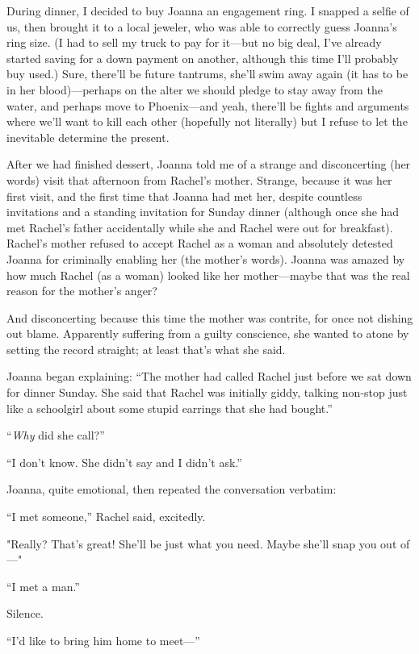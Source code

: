 During dinner, I decided to buy Joanna an engagement ring. I snapped a
selfie of us, then brought it to a local jeweler, who was able to
correctly guess Joanna's ring size. (I had to sell my truck to pay for
it---but no big deal, I've already started saving for a down payment on
another, although this time I'll probably buy used.) Sure, there'll be
future tantrums, she'll swim away again (it has to be in her
blood)---perhaps on the alter we should pledge to stay away from the
water, and perhaps move to Phoenix---and yeah, there'll be fights and
arguments where we'll want to kill each other (hopefully not literally)
but I refuse to let the inevitable determine the present.

After we had finished dessert, Joanna told me of a strange and
disconcerting (her words) visit that afternoon from Rachel's mother.
Strange, because it was her first visit, and the first time that Joanna
had met her, despite countless invitations and a standing invitation for
Sunday dinner (although once she had met Rachel's father accidentally
while she and Rachel were out for breakfast). Rachel's mother refused to
accept Rachel as a woman and absolutely detested Joanna for criminally
enabling her (the mother's words). Joanna was amazed by how much Rachel
(as a woman) looked like her mother---maybe that was the real reason for
the mother's anger?

And disconcerting because this time the mother was contrite, for once
not dishing out blame. Apparently suffering from a guilty conscience,
she wanted to atone by setting the record straight; at least that's what
she said.

Joanna began explaining: ``The mother had called Rachel just before we
sat down for dinner Sunday. She said that Rachel was initially giddy,
talking non-stop just like a schoolgirl about some stupid earrings that
she had bought.''

``\emph{Why} did she call?''

``I don't know. She didn't say and I didn't ask.''

Joanna, quite emotional, then repeated the conversation verbatim:

``I met someone,'' Rachel said, excitedly.

"Really? That's great! She'll be just what you need. Maybe she'll snap
you out of---"

``I met a man.''

Silence.

``I'd like to bring him home to meet---''


